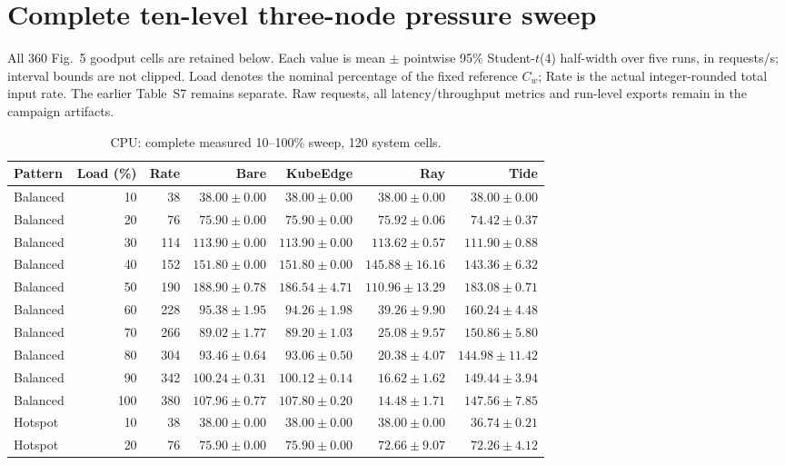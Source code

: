 \section*{Complete ten-level three-node pressure sweep}
All 360 Fig.~5 goodput cells are retained below. Each value is mean $\pm$ pointwise 95\% Student-$t$(4) half-width over five runs, in requests/s; interval bounds are not clipped. Load denotes the nominal percentage of the fixed reference $C_w$; Rate is the actual integer-rounded total input rate. The earlier Table~S7 remains separate. Raw requests, all latency/throughput metrics and run-level exports remain in the campaign artifacts.
\begin{table}[htbp]\centering\small
\caption{CPU: complete measured 10--100\% sweep, 120 system cells.}
\label{tab:fig6-sweep-cpu}
\begin{tabular*}{\linewidth}{@{\extracolsep{\fill}}lrrrrrr}
\toprule Pattern & Load (\%) & Rate & Bare & KubeEdge & Ray & Tide\\\midrule
Balanced & 10 & 38 & $38.00 \pm 0.00$ & $38.00 \pm 0.00$ & $38.00 \pm 0.00$ & $38.00 \pm 0.00$\\
Balanced & 20 & 76 & $75.90 \pm 0.00$ & $75.90 \pm 0.00$ & $75.92 \pm 0.06$ & $74.42 \pm 0.37$\\
Balanced & 30 & 114 & $113.90 \pm 0.00$ & $113.90 \pm 0.00$ & $113.62 \pm 0.57$ & $111.90 \pm 0.88$\\
Balanced & 40 & 152 & $151.80 \pm 0.00$ & $151.80 \pm 0.00$ & $145.88 \pm 16.16$ & $143.36 \pm 6.32$\\
Balanced & 50 & 190 & $188.90 \pm 0.78$ & $186.54 \pm 4.71$ & $110.96 \pm 13.29$ & $183.08 \pm 0.71$\\
Balanced & 60 & 228 & $95.38 \pm 1.95$ & $94.26 \pm 1.98$ & $39.26 \pm 9.90$ & $160.24 \pm 4.48$\\
Balanced & 70 & 266 & $89.02 \pm 1.77$ & $89.20 \pm 1.03$ & $25.08 \pm 9.57$ & $150.86 \pm 5.80$\\
Balanced & 80 & 304 & $93.46 \pm 0.64$ & $93.06 \pm 0.50$ & $20.38 \pm 4.07$ & $144.98 \pm 11.42$\\
Balanced & 90 & 342 & $100.24 \pm 0.31$ & $100.12 \pm 0.14$ & $16.62 \pm 1.62$ & $149.44 \pm 3.94$\\
Balanced & 100 & 380 & $107.96 \pm 0.77$ & $107.80 \pm 0.20$ & $14.48 \pm 1.71$ & $147.56 \pm 7.85$\\
\midrule
Hotspot & 10 & 38 & $38.00 \pm 0.00$ & $38.00 \pm 0.00$ & $38.00 \pm 0.00$ & $36.74 \pm 0.21$\\
Hotspot & 20 & 76 & $75.90 \pm 0.00$ & $75.90 \pm 0.00$ & $72.66 \pm 9.07$ & $72.26 \pm 4.12$\\

\end{tabular*}
\end{table}
